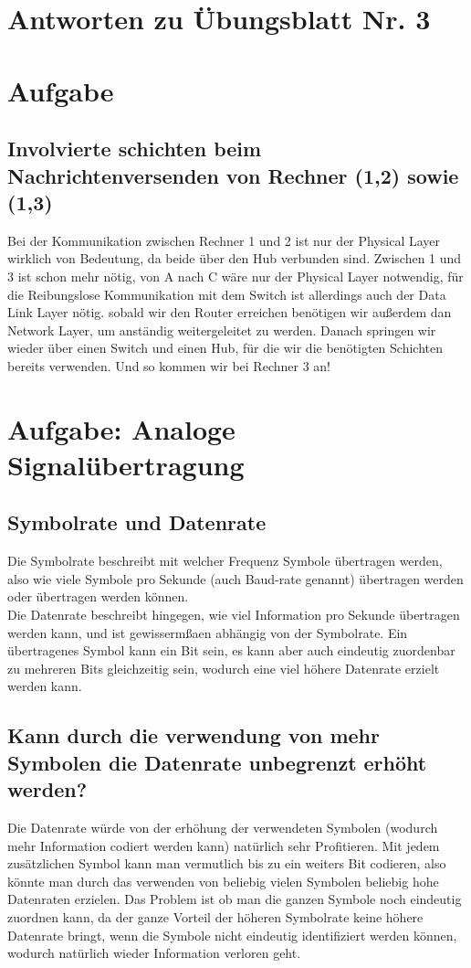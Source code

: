\documentclass{scrartcl}
\begin{document}
\section*{Antworten zu Übungsblatt Nr. 3}

\section{Aufgabe}

\subsection{}
\subsection{Involvierte schichten beim Nachrichtenversenden von Rechner (1,2) sowie (1,3)}
Bei der Kommunikation zwischen Rechner 1 und 2 ist nur der Physical Layer wirklich von Bedeutung,
da beide über den Hub verbunden sind. Zwischen 1 und 3 ist schon mehr nötig, von A nach C wäre nur
der Physical Layer notwendig, für die Reibungslose Kommunikation mit dem Switch ist allerdings auch
der Data Link Layer nötig. sobald wir den Router erreichen benötigen wir außerdem dan Network Layer,
um anständig weitergeleitet zu werden. Danach springen wir wieder über einen Switch und einen Hub,
für die wir die benötigten Schichten bereits verwenden. Und so kommen wir bei Rechner 3 an!


\section{Aufgabe: Analoge Signalübertragung}
\subsection{Symbolrate und Datenrate}
Die Symbolrate beschreibt mit welcher Frequenz Symbole übertragen werden, also wie viele Symbole pro
Sekunde (auch Baud-rate genannt) übertragen werden oder übertragen werden können. \\
Die Datenrate beschreibt hingegen, wie viel Information pro Sekunde übertragen werden kann, und ist
gewissermßaen abhängig von der Symbolrate. Ein übertragenes Symbol kann ein Bit sein, es kann aber auch
eindeutig zuordenbar zu mehreren Bits gleichzeitig sein, wodurch eine viel höhere Datenrate erzielt werden kann.

\subsection{Kann durch die verwendung von mehr Symbolen die Datenrate unbegrenzt erhöht werden?}
Die Datenrate würde von der erhöhung der verwendeten Symbolen (wodurch mehr Information codiert werden kann)
natürlich sehr Profitieren. Mit jedem zusätzlichen Symbol kann man vermutlich bis zu ein weiters Bit codieren,
also könnte man durch das verwenden von beliebig vielen Symbolen beliebig hohe Datenraten erzielen. Das Problem
ist ob man die ganzen Symbole noch eindeutig zuordnen kann, da der ganze Vorteil der höheren Symbolrate keine
höhere Datenrate bringt, wenn die Symbole nicht eindeutig identifiziert werden können, wodurch natürlich wieder
Information verloren geht.
\end{document}
